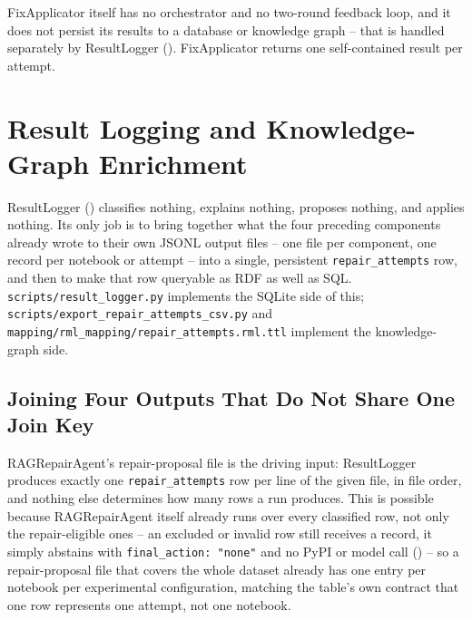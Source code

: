 FixApplicator itself has no orchestrator and no two-round feedback loop, and
it does not persist its results to a database or knowledge graph -- that is
handled separately by ResultLogger (). FixApplicator
returns one self-contained result per attempt.


\section{Result Logging and Knowledge-Graph Enrichment}
\label{sec:m-resultlogger}

ResultLogger () classifies nothing, explains
nothing, proposes nothing, and applies nothing. Its only job is to bring
together what the four preceding components already wrote to their own
JSONL output files -- one file per component, one record per notebook or
attempt -- into a single, persistent \texttt{repair\_attempts} row, and then
to make that row queryable as RDF as well as SQL.
\texttt{scripts/result\_logger.py} implements the SQLite side of this;
\texttt{scripts/export\_repair\_attempts\_csv.py} and
\texttt{mapping/rml\_mapping/repair\_attempts.rml.ttl} implement the
knowledge-graph side.

\subsection{Joining Four Outputs That Do Not Share One Join Key}
\label{sec:m-resultlogger-join}

RAGRepairAgent's repair-proposal file is the driving input: ResultLogger
produces exactly one \texttt{repair\_attempts} row per line of the given
file, in file order, and nothing else determines how many rows a run
produces. This is possible because RAGRepairAgent itself already runs over
every classified row, not only the repair-eligible ones -- an excluded or
invalid row still receives a record, it simply abstains with
\texttt{final\_action: "none"} and no PyPI or model call
() -- so a repair-proposal file that covers the whole
dataset already has one entry per notebook per experimental configuration,
matching the table's own contract that one row represents one attempt, not
one notebook.

